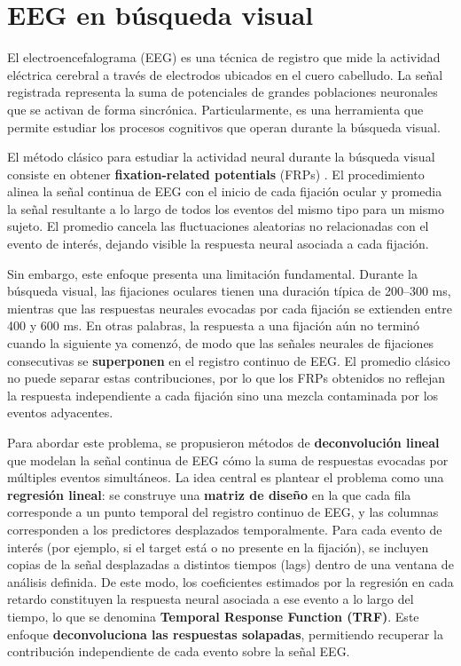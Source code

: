 \section{EEG en búsqueda visual}
\label{sec:eeg_modelo_damian}


El electroencefalograma (EEG) es una técnica de registro que mide la actividad eléctrica cerebral a través de electrodos ubicados en el cuero cabelludo. La señal registrada representa la suma de potenciales de grandes poblaciones neuronales que se activan de forma sincrónica. Particularmente, es una herramienta que permite estudiar los procesos cognitivos que operan durante la búsqueda visual.

El método clásico para estudiar la actividad neural durante la búsqueda visual 
consiste en obtener \textbf{fixation-related potentials} (FRPs) \citep{kamienkowski2012fixation}. El procedimiento 
alinea la señal continua de EEG con el inicio de cada fijación ocular y promedia 
la señal resultante a lo largo de todos los eventos del mismo tipo para un 
mismo sujeto. El promedio cancela las fluctuaciones aleatorias no relacionadas 
con el evento de interés, dejando visible la respuesta neural asociada a cada fijación.

Sin embargo, este enfoque presenta una limitación fundamental. Durante la búsqueda visual, las fijaciones oculares tienen 
una duración típica de 200--300 ms, mientras que las respuestas neurales 
evocadas por cada fijación se extienden entre 400 y 600 ms. En otras palabras, 
la respuesta a una fijación aún no terminó cuando la siguiente ya comenzó, de modo que las señales neurales de fijaciones consecutivas se 
\textbf{superponen} en el registro continuo de EEG. El promedio clásico no 
puede separar estas contribuciones, por lo que los FRPs obtenidos no reflejan 
la respuesta independiente a cada fijación sino una mezcla contaminada por 
los eventos adyacentes.

Para abordar este problema, se propusieron métodos de \textbf{deconvolución lineal} que modelan la señal continua de EEG cómo la suma de respuestas evocadas por múltiples eventos simultáneos. La idea central es plantear el problema como una 
\textbf{regresión lineal}: se construye una \textbf{matriz de diseño} en la que cada fila corresponde 
a un punto temporal del registro continuo de EEG, y las columnas corresponden 
a los predictores desplazados temporalmente. Para cada evento de interés (por ejemplo, si el target está o no presente en la fijación), se incluyen copias de la señal desplazadas a distintos tiempos (lags) dentro de una ventana de análisis definida. De este modo, los coeficientes estimados por la regresión en cada retardo 
constituyen la respuesta neural asociada a ese evento a lo largo del tiempo, 
lo que se denomina \textbf{Temporal Response Function (TRF)}. Este enfoque \textbf{deconvoluciona las respuestas solapadas}, permitiendo recuperar la contribución independiente de cada evento sobre la señal EEG.


